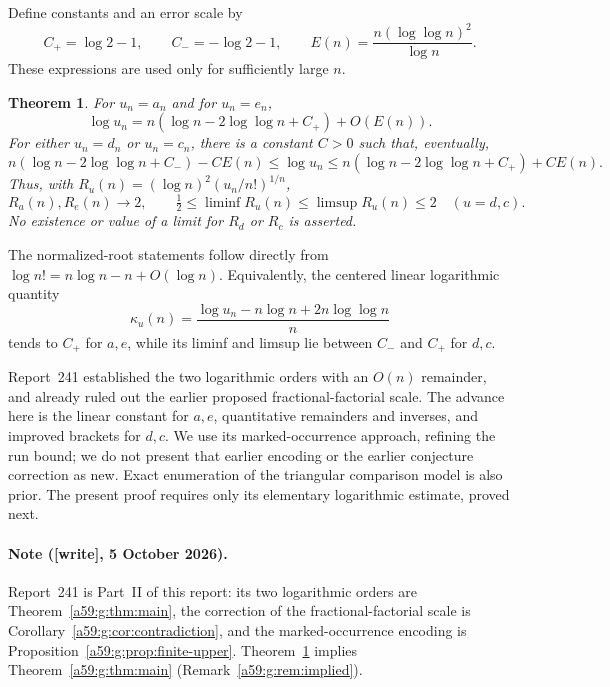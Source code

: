 \documentclass[11pt,letterpaper]{article}
\newtheorem{theorem}{Theorem}[section]\newtheorem{lemma}[theorem]{Lemma}\newtheorem{proposition}[theorem]{Proposition}\newtheorem{corollary}[theorem]{Corollary}
\theoremstyle{remark}\newtheorem{remark}[theorem]{Remark}
\newcommand{\wtag}{\textup{[write]}}
\theoremstyle{remark}\newtheorem{wremark}{Remark}\renewcommand{\thewremark}{W\arabic{wremark}}
\theoremstyle{plain}\newtheorem{wcorollary}[wremark]{Corollary}
\begin{document}
Define constants and an error scale by
\begin{equation}\label{a59:eq:constants}
 C_+=\log2-1,\qquad C_-=-\log2-1,\qquad
 E(n)=\frac{n(\log\log n)^2}{\log n}.
\end{equation}
These expressions are used only for sufficiently large $n$.
\begin{theorem}\label{a59:thm:main}
For $u_n=a_n$ and for $u_n=e_n$,
\begin{equation}\label{a59:eq:main}
 \log u_n=n(\log n-2\log\log n+C_+)+O(E(n)).
\end{equation}
For either $u_n=d_n$ or $u_n=c_n$, there is a constant $C>0$ such that, eventually,
\begin{equation}\label{a59:eq:bracket}
 n(\log n-2\log\log n+C_-)-CE(n)
 \le \log u_n
 \le n(\log n-2\log\log n+C_+)+CE(n).
\end{equation}
Thus, with $R_u(n)=(\log n)^2(u_n/n!)^{1/n}$,
\begin{equation}\label{a59:eq:roots}
 R_a(n),R_e(n)\longrightarrow2,\qquad
 \tfrac12\le\liminf R_u(n)\le\limsup R_u(n)\le2
 \quad(u=d,c).
\end{equation}
No existence or value of a limit for $R_d$ or $R_c$ is asserted.
\end{theorem}
The normalized-root statements follow directly from $\log n!=n\log n-n+O(\log n)$. Equivalently, the centered linear logarithmic quantity
\[
 \kappa_u(n)=\frac{\log u_n-n\log n+2n\log\log n}{n}
\]
tends to $C_+$ for $a,e$, while its liminf and limsup lie between $C_-$ and $C_+$ for $d,c$.

Report~241 \cite{report241} established the two logarithmic orders with an $O(n)$ remainder, and already ruled out the earlier proposed fractional-factorial scale. The advance here is the linear constant for $a,e$, quantitative remainders and inverses, and improved brackets for $d,c$. We use its marked-occurrence approach, refining the run bound; we do not present that earlier encoding or the earlier conjecture correction as new. Exact enumeration of the triangular comparison model is also prior. The present proof requires only its elementary logarithmic estimate, proved next.

\paragraph{Note (\wtag, 5 October 2026).} Report~241 is Part~II of this
report: its two logarithmic orders are Theorem~\ref{a59:g:thm:main}, the
correction of the fractional-factorial scale is
Corollary~\ref{a59:g:cor:contradiction}, and the marked-occurrence encoding
is Proposition~\ref{a59:g:prop:finite-upper}. Theorem~\ref{a59:thm:main}
implies Theorem~\ref{a59:g:thm:main} (Remark~\ref{a59:g:rem:implied}).
\end{document}
